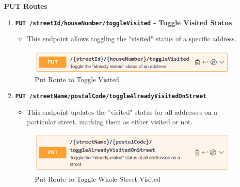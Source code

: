     \textbf{PUT Routes}

    \begin{enumerate}    
        \item \textbf{\texttt{PUT /{streetId}/{houseNumber}/toggleVisited} - Toggle Visited Status}
        \begin{itemize}
            \item This endpoint allows toggling the "visited" status of a specific address.
        \end{itemize} 
        \begin{figure} [H]
            \centering
            \includegraphics [width=1\textwidth] {images/andreas/praxis/toggleAlreadyVisitedOfAddress.png}
            \caption{Put Route to Toggle Visited}
        \end{figure}

        \item \textbf{\texttt{PUT /{streetName}/{postalCode}/toggleAlreadyVisitedOnStreet}}
        \begin{itemize}
            \item This endpoint updates the "visited" status for all addresses on a particular street, marking them as either visited or not.
        \end{itemize} 
        \begin{figure} [H]
            \centering
            \includegraphics [width=1\textwidth] {images/andreas/praxis/toggleAlreadyVisitedOfAddressesOnStreet.png}
            \caption{Put Route to Toggle Whole Street Visited}
        \end{figure}

        
    \end{enumerate}

